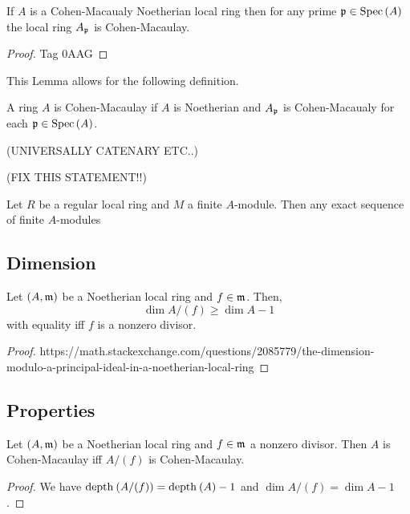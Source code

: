 \documentclass[12pt]{article}
\begin{document}
\begin{lemma}
If $A$ is a Cohen-Macaualy Noetherian local ring then for any prime $\mathfrak{p} \in \mathrm{Spec}\left( A \right)$ the local ring $A_{\mathfrak{p}}$ is Cohen-Macaulay.
\end{lemma}

\begin{proof}
Tag 0AAG
\end{proof}

\begin{rmk}
This Lemma allows for the following definition.
\end{rmk}

\begin{defn}
A ring $A$ is Cohen-Macaulay if $A$ is Noetherian and $A_{\mathfrak{p}}$ is Cohen-Macaualy for each $\mathfrak{p} \in \mathrm{Spec}\left( A \right)$.
\end{defn}

(UNIVERSALLY CATENARY ETC..)


(FIX THIS STATEMENT!!)

\begin{prop}
Let $R$ be a regular local ring and $M$ a finite $A$-module. Then any exact sequence of finite $A$-modules
\end{prop}

\subsection{Dimension}

\begin{prop}
Let $(A, \mathfrak{m})$ be a Noetherian local ring and $f \in \mathfrak{m}$. Then,
\[ \dim{A/(f)} \ge \dim{A} - 1 \]
with equality iff $f$ is a nonzero divisor.
\end{prop}

\begin{proof}
https://math.stackexchange.com/questions/2085779/the-dimension-modulo-a-principal-ideal-in-a-noetherian-local-ring
\end{proof}


\subsection{Properties}

\begin{prop}
Let $(A, \mathfrak{m})$ be a Noetherian local ring and $f \in \mathfrak{m}$ a nonzero divisor. Then $A$ is Cohen-Macaulay iff $A / (f)$ is Cohen-Macaulay.
\end{prop}

\begin{proof}
We have $\mathrm{depth}_{} \left( A/(f) \right) = \mathrm{depth}_{} \left( A \right) - 1$ and $\dim{A/(f)} = \dim{A} - 1$.
\end{proof}
\end{document}
